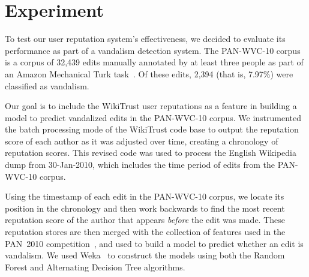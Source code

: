 \section{Experiment}

To test our user reputation system's effectiveness, we
decided to evaluate its performance as part of a vandalism
detection system.
The PAN-WVC-10 corpus is a corpus of 32,439 edits manually
annotated by at least three people as part of an Amazon
Mechanical Turk task~\cite{Potthast2010a}.
Of these edits, 2,394 (that is, 7.97\%) were classified as vandalism.

Our goal is to include the WikiTrust user reputations as a
feature in building a model to predict vandalized edits in
the PAN-WVC-10 corpus.
We instrumented the batch processing mode of the WikiTrust
code base to output the reputation score of each author as
it was adjusted over time, creating a chronology of reputation scores.
This revised code was used to process the English Wikipedia
dump from 30-Jan-2010, which includes the time period of
edits from the PAN-WVC-10 corpus.

Using the timestamp of each edit in the PAN-WVC-10 corpus,
we locate its position in the chronology and then work backwards
to find the most recent reputation score of the author
that appears \textit{before} the edit was made.
These reputation stores are then merged with the collection
of features used in the PAN~2010 competition~\cite{Adler2010},
and used to build a model to predict whether an edit is vandalism.
We used Weka~\cite{Weka09} to construct the models using both
the Random Forest and Alternating Decision Tree algorithms.

